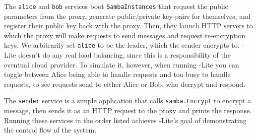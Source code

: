 The \texttt{alice} and \texttt{bob} services boot \texttt{SambaInstances} that request the public parameters from the proxy, generate public/private key-pairs for themselves, and register their public key back with the proxy. 
Then, they launch HTTP servers to which the proxy will make requests to send messages and request re-encryption keys.
We arbitrarily set \texttt{alice} to be the leader, which the sender encrypts to.
\SystemName-Lite doesn't do any real load balancing, since this is a responsibility of the eventual cloud provider.
To simulate it, however, when running \SystemName-Lite you can toggle between Alice being able to handle requests and too busy to handle requests, to see requests send to either Alice or Bob, who decrypt and respond.

The \texttt{sender} service is a simple application that calls \texttt{samba\-.En\-crypt} to encrypt a message, then sends it as an HTTP request to the proxy and prints the response.
Running these services in the order listed achieves \SystemName-Lite's goal of demonstrating the control flow of the \SystemName system.





